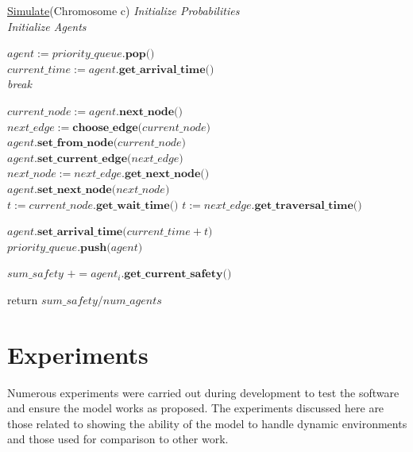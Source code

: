 \documentclass{sig-alternate-05-2015}
\begin{document}
			\begin{algorithm}
				
				\underline{Simulate}(Chromosome c)\;
				\emph{Initialize Probabilities}\\
				\emph{Initialize Agents}
				
				{
					$agent := priority\_queue.\textbf{pop()}$\\
					$current\_time := agent.\textbf{get\_arrival\_time()}$\\
					
					{
						\emph{break}
					}
					
					$current\_node := agent.\textbf{next\_node()}$\\
					$next\_edge := \textbf{choose\_edge(} current\_node \textbf{)}$\\
					
					$agent.\textbf{set\_from\_node(} current\_node \textbf{)}$\\
					$agent.\textbf{set\_current\_edge(} next\_edge \textbf{)}$\\
					$next\_node := next\_edge.\textbf{get\_next\_node()}$\\
					$agent.\textbf{set\_next\_node(} next\_node)$\\
					
					{
						$t := current\_node.\textbf{get\_wait\_time()}$
					}
					{
						$t := next\_edge.\textbf{get\_traversal\_time()}$
					}
				
					$agent.\textbf{set\_arrival\_time(} current\_time + t \textbf{)}$\\
					$priority\_queue.\textbf{push(} agent\textbf{)}$
				}
			
				{
					$sum\_safety$ $+= agent_i.\textbf{get\_current\_safety()}$
				}
					
				return $sum\_safety / num\_agents$
				
				\caption{Simulation of agent movement through a defined city topology, based on probabilities provided in Chromosome object}
			\end{algorithm}
		
		
	\section{Experiments}
		Numerous experiments were carried out during development to test the software and ensure the model works as proposed. The experiments discussed here are those related to showing the ability of the model to handle dynamic environments and those used for comparison to other work.
		
\end{document}
